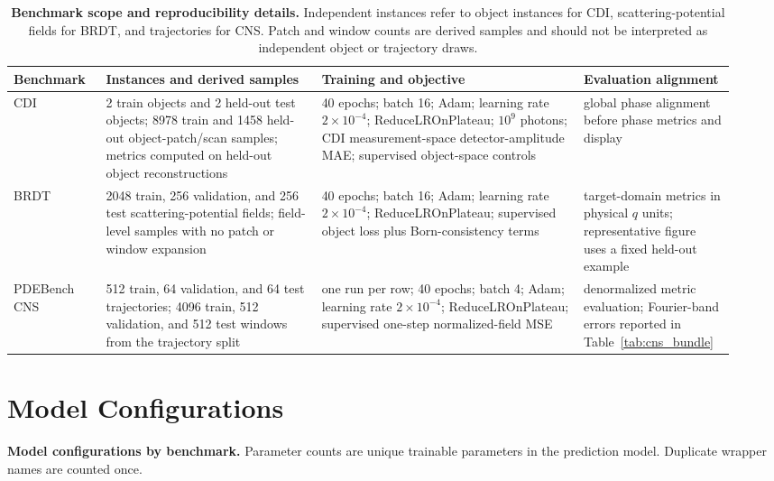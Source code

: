 \documentclass[11pt]{article}
\begin{document}
\begin{table}[t]
\centering
\scriptsize
\setlength{\tabcolsep}{3pt}
\caption{\textbf{Benchmark scope and reproducibility details.} Independent
instances refer to object instances for CDI, scattering-potential fields for
BRDT, and trajectories for CNS. Patch and window counts are derived samples and
should not be interpreted as independent object or trajectory draws.}
\label{tab:benchmark_scope_repro}
\begin{tabular}{p{0.12\linewidth}p{0.29\linewidth}p{0.34\linewidth}p{0.18\linewidth}}
\toprule
Benchmark & Instances and derived samples & Training and objective & Evaluation alignment \\
\midrule
CDI &
2 train objects and 2 held-out test objects; 8978 train and 1458 held-out
object-patch/scan samples; metrics computed on held-out object reconstructions &
40 epochs; batch 16; Adam; learning rate $2\times10^{-4}$;
ReduceLROnPlateau; $10^9$ photons; CDI measurement-space detector-amplitude MAE;
supervised object-space controls &
global phase alignment before phase metrics and display \\
BRDT &
2048 train, 256 validation, and 256 test scattering-potential fields; field-level
samples with no patch or window expansion &
40 epochs; batch 16; Adam; learning rate $2\times10^{-4}$;
ReduceLROnPlateau; supervised object loss plus Born-consistency terms &
target-domain metrics in physical $q$ units; representative figure uses a fixed
held-out example \\
PDEBench CNS &
512 train, 64 validation, and 64 test trajectories; 4096 train, 512 validation,
and 512 test windows from the trajectory split &
one run per row; 40 epochs; batch 4; Adam; learning rate
$2\times10^{-4}$; ReduceLROnPlateau; supervised one-step normalized-field MSE &
denormalized metric evaluation; Fourier-band errors reported in Table~\ref{tab:cns_bundle} \\
\bottomrule
\end{tabular}
\end{table}

\section{Model Configurations}

\begin{table}[t]
\centering
\scriptsize
\setlength{\tabcolsep}{3pt}
\caption{\textbf{Model configurations by benchmark.} Parameter counts are
unique trainable parameters in the prediction model. Duplicate wrapper names are
counted once.}
\label{tab:model_config_by_benchmark}
\resizebox{\textwidth}{!}{}
\end{table}
\end{document}
